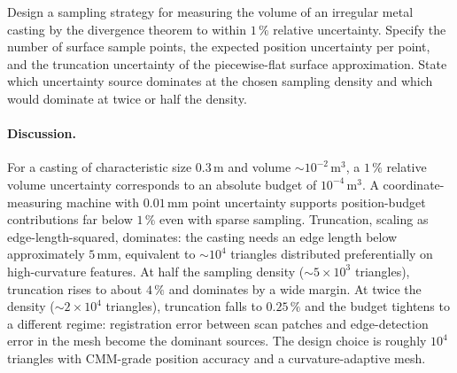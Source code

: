 \begin{exercise}
Design a sampling strategy for measuring the volume of an irregular
metal casting by the divergence theorem to within $1\,\%$ relative
uncertainty. Specify the number of surface sample points, the
expected position uncertainty per point, and the truncation
uncertainty of the piecewise-flat surface approximation. State
which uncertainty source dominates at the chosen sampling density
and which would dominate at twice or half the density.

\paragraph{Discussion.} For a casting of characteristic size
$0.3\,\si{\meter}$ and volume $\sim 10^{-2}\,\si{\meter\cubed}$, a
$1\,\%$ relative volume uncertainty corresponds to an absolute
budget of $10^{-4}\,\si{\meter\cubed}$. A coordinate-measuring
machine with $0.01\,\si{\milli\meter}$ point uncertainty supports
position-budget contributions far below $1\,\%$ even with sparse
sampling. Truncation, scaling as edge-length-squared, dominates:
the casting needs an edge length below approximately $5\,\si{\milli
\meter}$, equivalent to $\sim 10^{4}$ triangles distributed
preferentially on high-curvature features. At half the sampling
density ($\sim 5\times 10^{3}$ triangles), truncation rises to
about $4\,\%$ and dominates by a wide margin. At twice the density
($\sim 2 \times 10^{4}$ triangles), truncation falls to $0.25\,\%$
and the budget tightens to a different regime: registration error
between scan patches and edge-detection error in the mesh become
the dominant sources. The design choice is roughly $10^{4}$
triangles with CMM-grade position accuracy and a curvature-adaptive
mesh.
\end{exercise}

